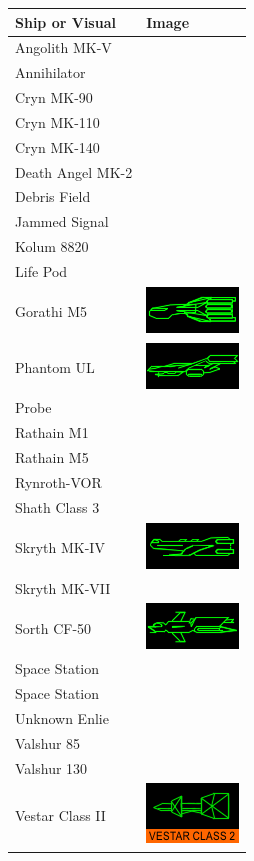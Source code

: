 \begin{itemize}
\begin{tabular}{ | l | l | }
\hline
Ship or Visual & Image \\
\hline
Angolith MK-V & \\
Annihilator & \\
Cryn MK-90 & \\
Cryn MK-110 & \\
Cryn MK-140 & \\
Death Angel MK-2 & \\
Debris Field & \\
Jammed Signal & \\
Kolum 8820 & \\
Life Pod & \\
Gorathi M5 & \includegraphics[scale=0.75]{images/ship_gorathi_m5.png} \\
Phantom UL & \includegraphics[scale=0.75]{images/ship_Phantom_UL.png} \\
Probe & \\
Rathain M1 & \\
Rathain M5 & \\
Rynroth-VOR & \\
Shath Class 3 & \\
Skryth MK-IV & \includegraphics[scale=0.75]{images/ship_skryth_mk-iv.png} \\
Skryth MK-VII & \\
Sorth CF-50 & \includegraphics[scale=0.75]{images/ship_sorth_cf-50.png} \\
Space Station & \\
Space Station & \\
Unknown Enlie & \\
Valshur 85 & \\
Valshur 130 & \\
Vestar Class II & \includegraphics[scale=0.75]{images/ship_vestar_class_2.png} \\

\end{tabular}
\end{itemize}
